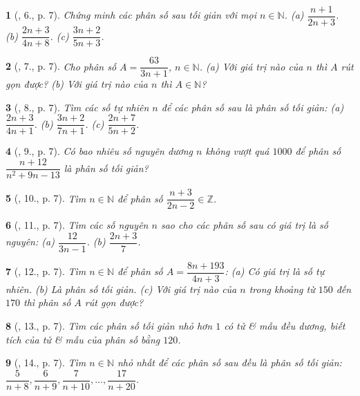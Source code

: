 \documentclass{article}
\newtheorem{baitoan}{}
\begin{document}
\begin{baitoan}[\cite{Binh_Toan_6_tap_2}, 6., p. 7]
	Chứng minh các phân số sau tối giản với mọi $n\in\mathbb{N}$. (a) $\dfrac{n + 1}{2n + 3}$. (b) $\dfrac{2n + 3}{4n + 8}$. (c) $\dfrac{3n + 2}{5n + 3}$.
\end{baitoan}

\begin{baitoan}[\cite{Binh_Toan_6_tap_2}, 7., p. 7]
	Cho phân số $A = \dfrac{63}{3n + 1}$, $n\in\mathbb{N}$. (a) Với giá trị nào của $n$ thì $A$ rút gọn được? (b) Với giá trị nào của $n$ thì $A\in\mathbb{N}$?
\end{baitoan}

\begin{baitoan}[\cite{Binh_Toan_6_tap_2}, 8., p. 7]
	Tìm các số tự nhiên $n$ để các phân số sau là phân số tối giản: (a) $\dfrac{2n + 3}{4n + 1}$. (b) $\dfrac{3n + 2}{7n + 1}$. (c) $\dfrac{2n + 7}{5n + 2}$.
\end{baitoan}

\begin{baitoan}[\cite{Binh_Toan_6_tap_2}, 9., p. 7]
	Có bao nhiêu số nguyên dương $n$ không vượt quá $1000$ để phân số $\dfrac{n + 12}{n^2 + 9n - 13}$ là phân số tối giản?
\end{baitoan}

\begin{baitoan}[\cite{Binh_Toan_6_tap_2}, 10., p. 7]
	Tìm $n\in\mathbb{N}$ để phân số $\dfrac{n + 3}{2n - 2}\in\mathbb{Z}$.
\end{baitoan}

\begin{baitoan}[\cite{Binh_Toan_6_tap_2}, 11., p. 7]
	Tìm các số nguyên $n$ sao cho các phân số sau có giá trị là số nguyên: (a) $\dfrac{12}{3n - 1}$. (b) $\dfrac{2n + 3}{7}$.
\end{baitoan}

\begin{baitoan}[\cite{Binh_Toan_6_tap_2}, 12., p. 7]
	Tìm $n\in\mathbb{N}$ để phân số $A = \dfrac{8n + 193}{4n + 3}$: (a) Có giá trị là số tự nhiên. (b) Là phân số tối giản. (c) Với giá trị nào của $n$ trong khoảng từ $150$ đến $170$ thì phân số $A$ rút gọn được?
\end{baitoan}

\begin{baitoan}[\cite{Binh_Toan_6_tap_2}, 13., p. 7]
	Tìm các phân số tối giản nhỏ hơn $1$ có tử \& mẫu đều dương, biết tích của tử \& mẫu của phân số bằng $120$.
\end{baitoan}

\begin{baitoan}[\cite{Binh_Toan_6_tap_2}, 14., p. 7]
	Tìm $n\in\mathbb{N}$ nhỏ nhất để các phân số sau đều là phân số tối giản: $\dfrac{5}{n + 8},\dfrac{6}{n + 9},\dfrac{7}{n + 10},\ldots,\dfrac{17}{n + 20}$.
\end{baitoan}
\end{document}
